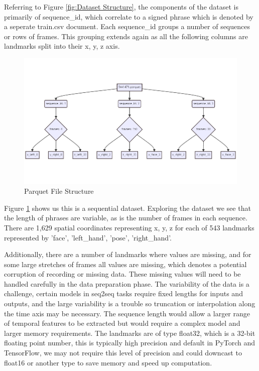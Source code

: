 \documentclass[preprint,12pt,review,authoryear]{elsarticle}
\begin{document}
Referring to Figure \ref{fig:Dataset Structure}, the components of the dataset is primarily of sequence_id, which correlate to a signed phrase which is denoted by a seperate train.csv document. Each sequence_id groups a number of sequences or rows of frames. This grouping extends again as all the following columns are landmarks split into their x, y, z axis.


\begin{figure}[h]
    \centering
    \includegraphics[width=1\textwidth]{images/parquet_structure_2.png}
    \caption{Parquet File Structure}
    \label{fig:Parquet File Structure}
\end{figure}

Figure \ref{fig:Parquet File Structure} shows us this is a sequential dataset. Exploring the dataset we see that the length of phrases are variable, as is the number of frames in each sequence. There are 1,629 spatial coordinates representing x, y, z for each of 543 landmarks represented by 'face', 'left_hand', 'pose', 'right_hand'. 

Additionally, there are a number of landmarks where values are missing, and for some large stretches of frames all values are missing, which denotes a potential corruption of recording or missing data. These missing values will need to be handled carefully in the data preparation phase. The variability of the data is a challenge, certain models in seq2seq tasks require fixed lengths for inputs and outputs, and the large variability is a trouble so truncation or interpolation along the time axis may be necessary. The sequence length would allow a larger range of temporal features to be extracted but would require a complex model and larger memory requirements.  The landmarks are of type float32, which is a 32-bit floating point number, this is typically high precision and default in PyTorch and TensorFlow, we may not require this level of precision and could downcast to float16 or another type to save memory and speed up computation.
\end{document}
